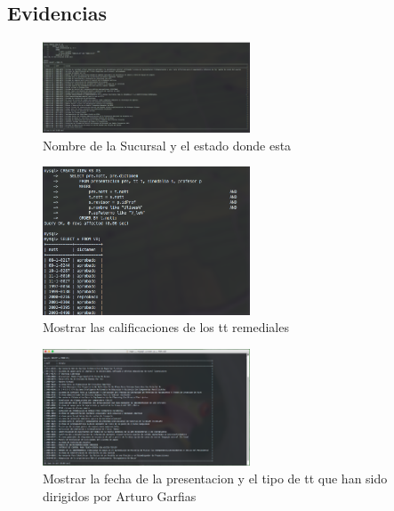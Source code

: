 \documentclass[12pt, fleqn]{article}                             %
\begin{document}
    \clearpage
    \subsection{Evidencias}

        \begin{figure}[ht!]
            \centering
            \includegraphics[width=0.55\textwidth]{BD6Reporte1}
            \caption{Nombre de la Sucursal y el estado donde esta}
        \end{figure}

        \begin{figure}[ht!]
            \centering
            \includegraphics[width=0.55\textwidth]{BD6Reporte2}
            \caption{Mostrar las calificaciones de los tt remediales}
        \end{figure}


        \begin{figure}[ht!]
            \centering
            \includegraphics[width=0.55\textwidth]{BD6Reporte3}
            \caption{Mostrar la fecha de la presentacion y el tipo de tt que han sido dirigidos por Arturo Garfias}
        \end{figure}
\end{document}
